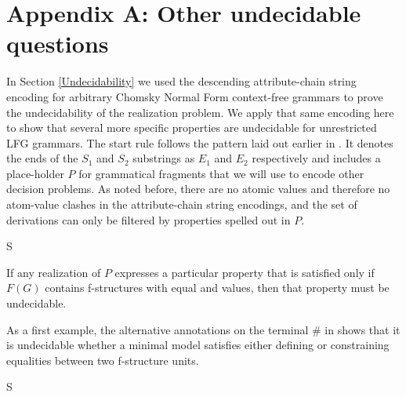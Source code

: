 \documentclass[output=paper,hidelinks]{langscibook}
\begin{document}
\section*{Appendix A:  Other undecidable questions}

In Section \ref{Undecidability} we used the descending attribute-chain string encoding  for arbitrary Chomsky Normal Form context-free grammars to prove the undecidability of the realization problem. We apply that same encoding here to show that several more specific properties are undecidable for unrestricted LFG grammars. The start rule  follows the pattern laid out earlier in .  It denotes the ends of the $S_1$ and $S_2$ substrings as $E_1$ and $E_2$ respectively and includes a place-holder $P$ for grammatical fragments that we will use to encode other decision problems.  As noted before, there are no atomic values and therefore no atom-value clashes in the attribute-chain string encodings, and the set of derivations can only be filtered by properties spelled out in $P$.

\ea\label{tool}
\small\rcat S \rarrow 
                              \hsp{1em}
 \z

\noindent If any realization of $P$ expresses a particular property that is satisfied only if $F(G)$ contains f-structures with equal  and  values, then that property must be undecidable.  

As a first example, the alternative annotations on the terminal \#  in  shows that it is undecidable whether a minimal model satisfies either defining or constraining equalities between two f-structure units.

\ea\label{eqc}
\small S \rarrow     {}
\z
\end{document}
